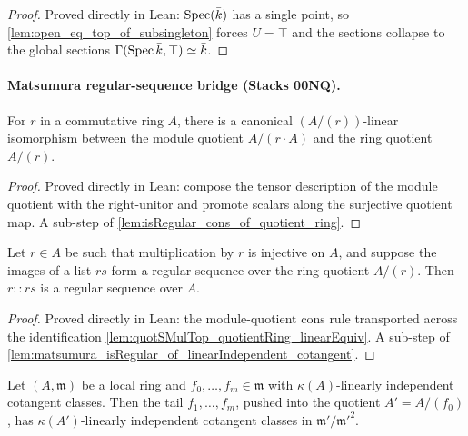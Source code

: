 \begin{proof}
  Proved directly in Lean: \(\operatorname{Spec}(\bar k)\) has a single point, so
  \cref{lem:open_eq_top_of_subsingleton} forces \(U = \top\) and the sections collapse
  to the global sections \(\Gamma(\operatorname{Spec} \bar k, \top) \simeq \bar k\).
\end{proof}

\paragraph{Matsumura regular-sequence bridge (Stacks 00NQ).}

\begin{lemma}
  \label{lem:quotSMulTop_quotientRing_linearEquiv}
  For \(r\) in a commutative ring \(A\), there is a canonical \((A/(r))\)-linear
  isomorphism between the module quotient \(A/(r \cdot A)\) and the ring quotient
  \(A/(r)\).
\end{lemma}

\begin{proof}
  Proved directly in Lean: compose the tensor description of the module quotient with
  the right-unitor and promote scalars along the surjective quotient map. A sub-step of
  \cref{lem:isRegular_cons_of_quotient_ring}.
\end{proof}

\begin{lemma}
  \label{lem:isRegular_cons_of_quotient_ring}
  Let \(r \in A\) be such that multiplication by \(r\) is injective on \(A\), and
  suppose the images of a list \(rs\) form a regular sequence over the ring quotient
  \(A/(r)\). Then \(r :: rs\) is a regular sequence over \(A\).
\end{lemma}

\begin{proof}
  Proved directly in Lean: the module-quotient cons rule transported across the
  identification \cref{lem:quotSMulTop_quotientRing_linearEquiv}. A sub-step of
  \cref{lem:matsumura_isRegular_of_linearIndependent_cotangent}.
\end{proof}

\begin{lemma}
  \label{lem:matsumura_descent_cotangent}
  Let \((A, \mathfrak m)\) be a local ring and \(f_0,\dots,f_m \in \mathfrak m\) with
  \(\kappa(A)\)-linearly independent cotangent classes. Then the tail
  \(f_1,\dots,f_m\), pushed into the quotient \(A' = A/(f_0)\), has
  \(\kappa(A')\)-linearly independent cotangent classes in
  \(\mathfrak m'/\mathfrak m'^2\).
\end{lemma}

